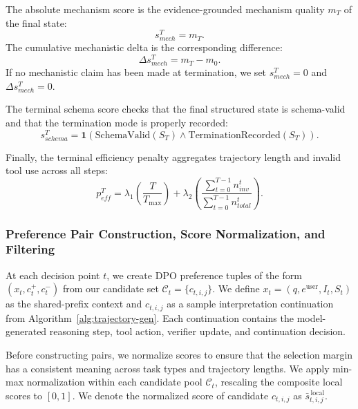 \documentclass[thesis,letterpaper,12pt]{utthesis}
\begin{document}
The absolute mechanism score is the evidence-grounded mechanism quality $m_T$ of the final state:
\begin{equation}\label{eqn:terminal-mech-abs}
    s^{T}_{mech} = m_T.
\end{equation}
The cumulative mechanistic delta is the corresponding difference:
\begin{equation}\label{eqn:terminal-mech-delta}
    \Delta s^{T}_{mech} = m_T - m_0.
\end{equation}
If no mechanistic claim has been made at termination, we set $s^{T}_{mech} = 0$ and $\Delta s^{T}_{mech} = 0$.

The terminal schema score checks that the final structured state is schema-valid and that the termination mode is properly recorded:
\begin{equation}\label{eqn:terminal-schema}
    s^{T}_{schema} = \mathbf{1}(\text{SchemaValid}(S_T) \land \text{TerminationRecorded}(S_T)).
\end{equation}

Finally, the terminal efficiency penalty aggregates trajectory length and invalid tool use across all steps:
\begin{equation}\label{eqn:terminal-eff}
    p^{T}_{eff} = \lambda_1 \left(\frac{T}{T_{\max}}\right) + \lambda_2 \left(\frac{\sum_{t=0}^{T-1} n^{t}_{inv}}{\sum_{t=0}^{T-1} n^{t}_{total}}\right).
\end{equation}

\subsubsection{Preference Pair Construction, Score Normalization, and Filtering}\label{sec:pref-construction}
At each decision point $t$, we create DPO preference tuples of the form $(x_t, c_t^+, c_t^-)$ from our candidate set $\mathcal{C}_t = \{c_{t,i,j}\}$. We define $x_t = (q, e^{\text{user}}, I_t, S_t)$ as the shared-prefix context and $c_{t,i,j}$ as a sample interpretation continuation from Algorithm~\ref{alg:trajectory-gen}. Each continuation contains the model-generated reasoning step, tool action, verifier update, and continuation decision.

Before constructing pairs, we normalize scores to ensure that the selection margin has a consistent meaning across task types and trajectory lengths. We apply min-max normalization within each candidate pool $\mathcal{C}_t$, rescaling the composite local scores to $[0, 1]$. We denote the normalized score of candidate $c_{t,i,j}$ as $\bar{s}^{\,\text{local}}_{t,i,j}$.
\end{document}
